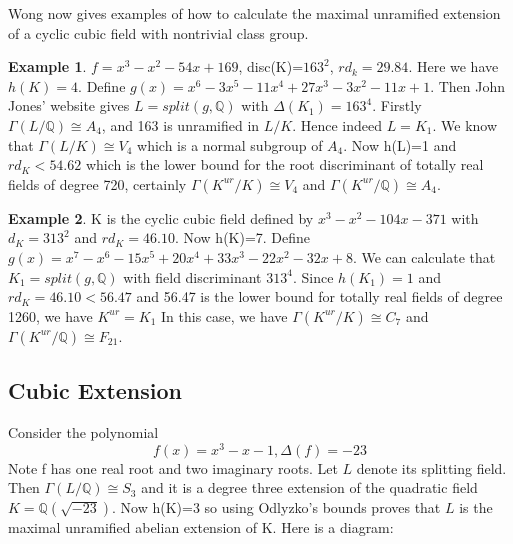 \documentclass[12pt]{extarticle}
\newcommand{\Q}{\mathbb{Q}}
\newcommand{\<}{\langle}
\renewcommand{\>}{\rangle}
\theoremstyle{definition}
\newtheorem*{example}{Example}
\begin{document}
Wong now gives examples of how to calculate the maximal unramified extension of a cyclic cubic field with nontrivial class group. \begin{example}
    $f=x^3-x^2-54x+169$, disc(K)=$163^2$, $rd_{k}=29.84$. Here 
    we have $h(K)=4$. Define $g(x)=x^6-3x^5-11x^4+27x^3-3x^2-11x+1$. Then John Jones' website gives $L = split(g,\Q)$ with $\Delta(K_1)=163^4$. Firstly $\Gamma(L/\Q) \cong A_4$, and 163 is unramified in $L/K$. Hence indeed $L=K_1$. We know that $\Gamma(L/K)\cong V_4$ which is a normal subgroup of $A_4$. Now h(L)=1 and $rd_K < 54.62$ which is the lower bound for the root discriminant of totally real fields of degree 720, certainly $\Gamma(K^{ur}/K) \cong V_4$ and $\Gamma(K^{ur}/\Q) \cong A_4$. 
\end{example}
\begin{example}
K is the cyclic cubic field defined by $x^3-x^2-104x-371$ with $d_K = 313^2$
and $rd_{K} = 46.10$. Now h(K)=7. Define $g(x) = x^7-x^6-15x^5+20x^4+33x^3-22x^2-32x+8$. We can calculate that $K_1=split(g,\Q)$ with field discriminant $313^4$. Since $h(K_1) = 1$ and $rd_K = 46.10 < 56.47$ and 56.47 is the lower
bound for totally real fields of degree 1260, we have $K^{ur}=K_1$ In this
case, we have $\Gamma(K^{ur}/K) \cong C_7$ and $\Gamma(K^{ur}/\Q) \cong F_{21} $.  
\end{example}
\subsection{Cubic Extension}
Consider the polynomial \begin{equation}
 f(x)=x^3-x-1, \Delta(f)=-23
\end{equation}
Note f has one real root and two imaginary roots. Let $L$ denote its splitting field. Then $\Gamma(L/\Q)\cong S_3$ and it is a degree three extension of the quadratic field $K= \Q(\sqrt{-23})$. Now h(K)=3 so using Odlyzko's bounds proves that $L$ is the maximal unramified abelian extension of K. Here is a diagram:
\begin{center}
\end{center}
\end{document}
